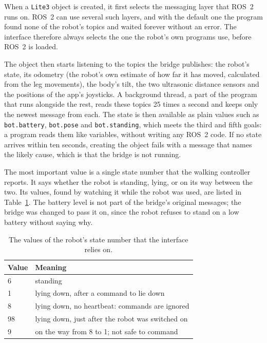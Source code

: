 When a \texttt{Lite3} object is created, it first selects the messaging layer that ROS~2 runs on. ROS~2
can use several such layers, and with the default one the program found none of the robot's topics and
waited forever without an error. The interface therefore always selects the one the robot's own programs
use, before ROS~2 is loaded.

The object then starts listening to the topics the bridge publishes: the robot's state, its odometry (the
robot's own estimate of how far it has moved, calculated from the leg movements), the body's tilt, the two
ultrasonic distance sensors and the positions of the app's joysticks. A background thread, a part of the
program that runs alongside the rest, reads these topics 25 times a second and keeps only the newest
message from each. The state is then available as plain values such as \texttt{bot.battery},
\texttt{bot.pose} and \texttt{bot.standing}, which meets the third and fifth goals: a program reads them
like variables, without writing any ROS~2 code. If no state arrives within ten seconds, creating the object
fails with a message that names the likely cause, which is that the bridge is not running.

The most important value is a single state number that the walking controller reports. It says whether the
robot is standing, lying, or on its way between the two. Its values, found by watching it while the robot
was used, are listed in Table~\ref{tab:states}. The battery level is not part of the bridge's original
messages; the bridge was changed to pass it on, since the robot refuses to stand on a low battery without
saying why.

\begin{table}[htbp]
\centering
\caption{The values of the robot's state number that the interface relies on.}
\label{tab:states}
\begin{tabular}{@{}ll@{}}
\toprule
Value & Meaning \\
\midrule
6  & standing \\
1  & lying down, after a command to lie down \\
8  & lying down, no heartbeat: commands are ignored \\
98 & lying down, just after the robot was switched on \\
9  & on the way from 8 to 1; not safe to command \\
\bottomrule
\end{tabular}
\end{table}

